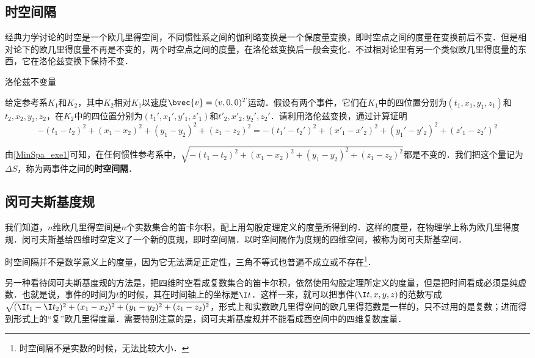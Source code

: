 
\subsection{时空间隔}
经典力学讨论的时空是一个欧几里得空间，不同惯性系之间的伽利略变换是一个保度量变换，即时空点之间的度量在变换前后不变．但是相对论下的欧几里得度量不再是不变的，两个时空点之间的度量，在洛伦兹变换后一般会变化．不过相对论里有另一个类似欧几里得度量的东西，它在洛伦兹变换下保持不变．

\begin{exercise}{洛伦兹不变量}\label{MinSpa_exe1}

给定参考系$K_1$和$K_2$，其中$K_2$相对$K_1$以速度$\bvec{v}=(v,0,0)^T$运动．假设有两个事件，它们在$K_1$中的四位置分别为$(t_1, x_1, y_1, z_1)$和$t_2, x_2, y_2, z_2$，在$K_2$中的四位置分别为$(t_1', x_1', y'_1, z'_1)$和$t'_2, x'_2, y_2', z_2'$．请利用洛伦兹变换，通过计算证明
\begin{equation}
-(t_1-t_2)^2+(x_1-x_2)^2+(y_1-y_2)^2+(z_1-z_2)^2=-(t_1'-t_2')^2+(x'_1-x'_2)^2+(y_1'-y'_2)^2+(z'_1-z_2')^2
\end{equation}
\end{exercise}

由\autoref{MinSpa_exe1}可知，在任何惯性参考系中，$\sqrt{-(t_1-t_2)^2+(x_1-x_2)^2+(y_1-y_2)^2+(z_1-z_2)^2}$都是不变的．我们把这个量记为$\Delta S$，称为两事件之间的\textbf{时空间隔}．

\subsection{闵可夫斯基度规}

我们知道，$n$维欧几里得空间是$n$个实数集合的笛卡尔积，配上用勾股定理定义的度量所得到的．这样的度量，在物理学上称为欧几里得度规．闵可夫斯基给四维时空定义了一个新的度规，即时空间隔．以时空间隔作为度规的四维空间，被称为闵可夫斯基空间．

时空间隔并不是数学意义上的度量，因为它无法满足正定性，三角不等式也普遍不成立或不存在\footnote{时空间隔不是实数的时候，无法比较大小．}．

另一种看待闵可夫斯基度规的方法是，把四维时空看成复数集合的笛卡尔积，依然使用勾股定理所定义的度量，但是把时间看成必须是纯虚数．也就是说，事件的时间为$t$的时候，其在时间轴上的坐标是$\I t$．这样一来，就可以把事件$(\I t, x, y, z)$的范数写成$\sqrt{(\I t_1-\I t_2)^2+(x_1-x_2)^2+(y_1-y_2)^2+(z_1-z_2)^2}$，形式上和实数欧几里得空间的欧几里得范数是一样的，只不过用的是复数；进而得到形式上的“复”欧几里得度量．需要特别注意的是，闵可夫斯基度规并不能看成酉空间中的四维复数度量．

